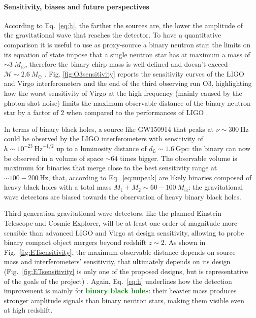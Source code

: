 \documentclass[a4paper,titlepage]{book}     	%
\newcommand{\sun}{\ensuremath{_\odot}}
\newcommand{\msun}{\ensuremath{M\sun}}
\newcommand{\erika}[1]{\textcolor{green}{\bf#1}}
\begin{document}
\paragraph{Sensitivity, biases and future perspectives}
According to Eq.\ \ref{eq:h}, the farther the sources are, the lower the amplitude of the gravitational wave that reaches the detector.  To have a quantitative comparison it is useful to use as proxy-source a binary neutron star: the limits on its equation of state impose that a single neutron star has at maximum a mass of $\sim 3~\msun$, therefore the binary chirp mass is well-defined and doesn't exceed $\mathcal{M} \sim 2.6 ~\msun$ \cite{NSreview}. Fig. \ref{fig:O3sensitivity} reports the sensitivity curves of the LIGO and Virgo interferometers and the end of the third observing run O3, highlighting how the worst sensitivity of Virgo at the high frequency (mainly caused by the photon shot noise) limits the maximum observable distance of the binary neutron star by a factor of 2 when compared to the performances of LIGO \cite{GWTC-3}.

In terms of binary black holes, a source like GW150914 that peaks at $\nu \sim 300~\text{Hz}$ could be observed by the LIGO interferometers with sensitivity of $h \sim 10^{-23}~ \text{Hz}^{-1/2}$ up to a luminosity distance of $d_L \sim 1.6~\text{Gpc}$: the binary can now be observed in a volume of space $\sim 64$ times bigger. The observable volume is maximum for binaries that merge close to the best sensitivity range at $\sim 100-200~\text{Hz}$, that, according to Eq.\ \ref{eq:nupeak} are likely binaries composed of heavy black holes with a total mass  $M_1+M_2 \sim 60-100~\msun$: the gravitational wave detectors are biased towards the observation of heavy binary black holes.


Third generation gravitational wave detectors, like the planned Einstein Telescope and Cosmic Explorer, will be at least one order of magnitude more sensible than advanced LIGO and Virgo at design sensitivity, allowing to probe binary compact object mergers beyond redshift $z \sim 2$. As shown in Fig.\ \ref{fig:ETsensitivity}, the maximum observable distance depends on source mass and interferometers' sensitivity, that ultimately depends on its design (Fig.\ \ref{fig:ETsensitivity} is only one of the proposed designs, but is representative of the goals of the project)  \cite{EThorizonsensitivity}. Again, Eq.\ \ref{eq:h} underlines how the detection improvement is mainly for \erika{binary black holes}: their heavier mass produces stronger amplitude signals than binary neutron stars, making them visible even at high redshift.
\end{document}
